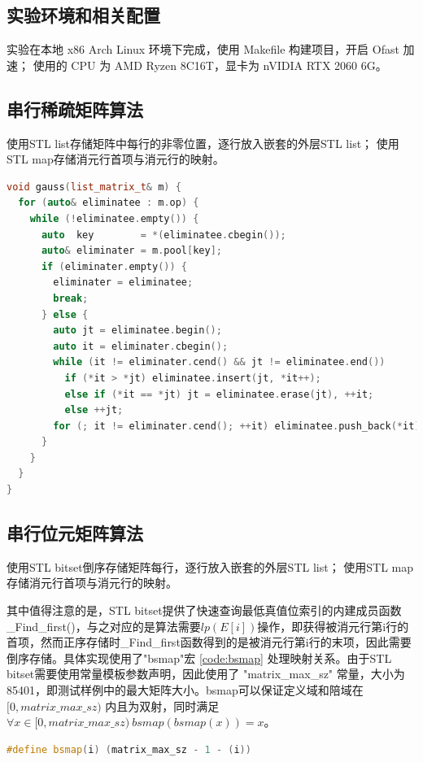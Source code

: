\documentclass[a4paper]{article}
\begin{document}
\subsection{实验环境和相关配置}
实验在本地 x86 Arch Linux 环境下完成，使用 Makefile 构建项目，开启 Ofast 加速；
使用的 CPU 为 AMD Ryzen 8C16T，显卡为 nVIDIA RTX 2060 6G。

\subsection{串行稀疏矩阵算法}
使用STL list存储矩阵中每行的非零位置，逐行放入嵌套的外层STL list；
使用STL map存储消元行首项与消元行的映射。

\begin{lstlisting}[frame=trbl, language={C++}, caption={稀疏矩阵消元部分}]
void gauss(list_matrix_t& m) {
  for (auto& eliminatee : m.op) {
    while (!eliminatee.empty()) {
      auto  key        = *(eliminatee.cbegin());
      auto& eliminater = m.pool[key];
      if (eliminater.empty()) {
        eliminater = eliminatee;
        break;
      } else {
        auto jt = eliminatee.begin();
        auto it = eliminater.cbegin();
        while (it != eliminater.cend() && jt != eliminatee.end())
          if (*it > *jt) eliminatee.insert(jt, *it++);
          else if (*it == *jt) jt = eliminatee.erase(jt), ++it;
          else ++jt;
        for (; it != eliminater.cend(); ++it) eliminatee.push_back(*it);
      }
    }
  }
}
\end{lstlisting}

\subsection{串行位元矩阵算法}
使用STL bitset倒序存储矩阵每行，逐行放入嵌套的外层STL list；
使用STL map存储消元行首项与消元行的映射。

其中值得注意的是，STL bitset提供了快速查询最低真值位索引的内建成员函数\_Find\_first()，与之对应的是算法需要$lp(E[i])$操作，即获得被消元行第i行的首项，然而正序存储时\_Find\_first函数得到的是被消元行第i行的末项，因此需要倒序存储。具体实现使用了"bsmap"宏 \ref{code:bsmap} 处理映射关系。由于STL bitset需要使用常量模板参数声明，因此使用了 "matrix\_max\_sz" 常量，大小为 85401，即测试样例中的最大矩阵大小。bsmap可以保证定义域和陪域在 $[0, matrix\_max\_sz)$ 内且为双射，同时满足 $\forall{x \in [0, matrix\_max\_sz)}\ bsmap(bsmap(x)) = x$。
\begin{lstlisting}[frame=trbl, language={C++}, caption={bsmap 宏}, label = {code:bsmap}]
#define bsmap(i) (matrix_max_sz - 1 - (i))
\end{lstlisting}
\end{document}
